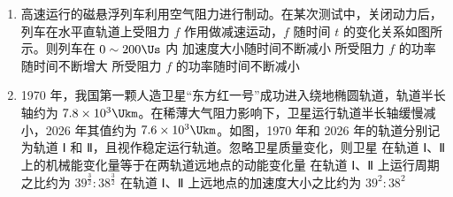 \documentclass[\gkver]{gaokaozhenti}
\begin{document}
\begin{enumerate}
{a 在漂移区内做匀速直线运动，运动时长 $t_1$ 满足 $v_a\cos\theta\cdot t_1=L$，即 $t_1=\frac{L}{v_a\cos\theta}$。

a 在反射区内的水平分运动为匀变速直线运动，竖直分运动为匀速直线运动，加速度大小 $a=\frac{q_aE}{m_a}=KE$，运动至电场最深处的时长 $t_2$ 满足 $KE\cdot t_2=v_a\cos\theta$，即 $t_2=\frac{v_a\cos\theta}{KE}$。

由运动的对称性可知，a 在质谱仪内的飞行总时间 $t_a=2(t_1+t_2)=2\left(\frac{L}{v_a\cos\theta}+\frac{v_a\cos\theta}{KE}\right)$。

同理，b 的飞行总时间 $t_b=2\left(\frac{L}{v_b\cos\theta}+\frac{v_b\cos\theta}{KE}\right)$。

由题意 $t_a=t_b$，联立可得 $\frac{L}{v_a\cos\theta}+\frac{v_a\cos\theta}{KE}=\frac{L}{v_b\cos\theta}+\frac{v_b\cos\theta}{KE}$，

整理得 $\frac{L(v_b-v_a)}{v_av_b\cos\theta}=\frac{(v_b-v_a)\cos\theta}{KE}$，即 $E=\frac{v_av_b\cos^2\theta}{KL}$。

故选 C。
}

\item
高速运行的磁悬浮列车利用空气阻力进行制动。在某次测试中，关闭动力后，列车在水平直轨道上受阻力 $f$ 作用做减速运动，$f$ 随时间 $t$ 的变化关系如图所示。则列车在 $0\sim200\Us$ 内
{加速度大小随时间不断减小}
{所受阻力 $f$ 的功率随时间不断增大}
{所受阻力 $f$ 的功率随时间不断减小}

\item
1970 年，我国第一颗人造卫星“东方红一号”成功进入绕地椭圆轨道，轨道半长轴约为 $7.8\times10^3\Ukm$。在稀薄大气阻力影响下，卫星运行轨道半长轴缓慢减小，2026 年其值约为 $7.6\times10^3\Ukm$。如图，1970 年和 2026 年的轨道分别记为轨道 Ⅰ 和 Ⅱ，且视作稳定运行轨道。忽略卫星质量变化，则卫星
{在轨道 Ⅰ、Ⅱ 上的机械能变化量等于在两轨道远地点的动能变化量}
{在轨道 Ⅰ、Ⅱ 上运行周期之比约为 $39^{\frac{3}{2}}:38^{\frac{3}{2}}$}
{在轨道 Ⅰ、Ⅱ 上远地点的加速度大小之比约为 $39^2:38^2$}
\end{enumerate}
\end{document}
